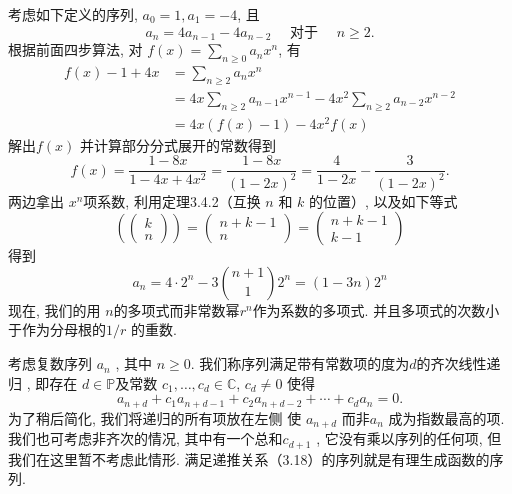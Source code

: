\documentclass[a4paper,12pt]{ctexbook}
\begin{document}
考虑如下定义的序列,  $a_{0}=1, a_{1}=-4$, 且
\[
a_{n}=4 a_{n-1}-4 a_{n-2} \quad \text { 对于  } \quad  n \geq 2 .\tag{3.15}
\]根据前面四步算法, 对 $f(x)=\sum_{n \geq 0} a_{n} x^{n}$, 有
$$
\begin{aligned}
f(x)-1+4 x &=\sum_{n \geq 2} a_{n} x^{n} \\
&=4 x \sum_{n \geq 2} a_{n-1} x^{n-1}-4 x^{2} \sum_{n \geq 2} a_{n-2} x^{n-2} \\
&=4 x(f(x)-1)-4 x^{2} f(x)
\end{aligned}
$$
解出$f(x)$ 并计算部分分式展开的常数得到
$$
f(x)=\frac{1-8 x}{1-4 x+4 x^{2}}=\frac{1-8 x}{(1-2 x)^{2}}=\frac{4}{1-2 x}-\frac{3}{(1-2 x)^{2}} .
$$
两边拿出 $x^{n}$项系数, 利用定理3.4.2（互换  $n$ 和 $k$ 的位置）, 以及如下等式
\[
\left(\left(\begin{array}{l}
k \\
n
\end{array}\right)\right)=\left(\begin{array}{c}
n+k-1 \\
n
\end{array}\right)=\left(\begin{array}{c}
n+k-1 \\
k-1
\end{array}\right)\tag{3.16}
\]
得到
\[
a_{n}=4 \cdot 2^{n}-3\binom{n+1}{1} 2^{n}=(1-3 n) 2^{n} \tag{3.17}
\]
现在, 我们的用 $n$的多项式而非常数幂$r^{n}$作为系数的多项式. 并且多项式的次数小于作为分母根的$1 / r$ 的重数.

考虑复数序列 $a_{n}$ , 其中 $n \geq 0$. 我们称序列满足带有常数项的度为$d$的齐次线性递归 , 即存在 $d \in \mathbb{P}$及常数 $c_{1}, \ldots, c_{d} \in \mathbb{C}$,  $c_{d} \neq 0$ 使得
\[
a_{n+d}+c_{1} a_{n+d-1}+c_{2} a_{n+d-2}+\cdots+c_{d} a_{n}=0 .\tag{3.18}
\]
为了稍后简化, 我们将递归的所有项放在左侧
使 $a_{n+d}$ 而非$a_{n}$ 成为指数最高的项. 我们也可考虑非齐次的情况, 其中有一个总和$c_{d+1}$ , 它没有乘以序列的任何项, 但我们在这里暂不考虑此情形. 满足递推关系（3.18）的序列就是有理生成函数的序列.
\end{document}
